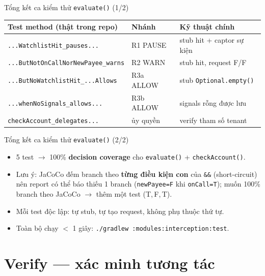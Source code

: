 \documentclass[aspectratio=169,12pt]{beamer}
\begin{document}
\begin{frame}{Tổng kết ca kiểm thử \texttt{evaluate()} (1/2)}
  \begin{center}
  \footnotesize
  \begin{tabular}{p{5.9cm}p{2.2cm}p{4.0cm}}
    \toprule
    \textbf{Test method (thật trong repo)} & \textbf{Nhánh} & \textbf{Kỹ thuật chính} \\
    \midrule
    \texttt{...WatchlistHit\_pauses...} & R1 PAUSE & stub hit + captor sự kiện \\
    \texttt{...ButNotOnCallNorNewPayee\allowbreak\_warns} & R2 WARN & stub hit, request F/F \\
    \texttt{...ButNoWatchlistHit\allowbreak\_...Allows} & R3a ALLOW & stub \texttt{Optional.empty()} \\
    \texttt{...whenNoSignals\_allows...} & R3b ALLOW & signals rỗng được lưu \\
    \texttt{checkAccount\_delegates...} & ủy quyền & verify tham số tenant \\
    \bottomrule
  \end{tabular}
  \end{center}
\end{frame}

\begin{frame}{Tổng kết ca kiểm thử \texttt{evaluate()} (2/2)}
  \begin{itemize}
    \item 5 test $\to$ 100\% \textbf{decision coverage} cho \texttt{evaluate()} + \texttt{checkAccount()}.
    \item Lưu ý: JaCoCo đếm branch theo \textbf{từng điều kiện con} của
      \texttt{\&\&} (short-circuit) nên report có thể báo thiếu 1 branch
      (\texttt{newPayee=F} khi \texttt{onCall=T}); muốn 100\% branch theo
      JaCoCo $\to$ thêm một test (T,\,F,\,T).
    \item Mỗi test độc lập: tự stub, tự tạo request, không phụ thuộc thứ tự.
    \item Toàn bộ chạy $<$ 1 giây: \texttt{./gradlew :modules:interception:test}.
  \end{itemize}
\end{frame}

\section{Verify --- xác minh tương tác}
\end{document}
